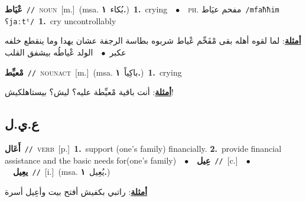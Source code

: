 \documentclass[10pt,a4paper,twoside]{article} %
\begin{document}
\begin{multicols}{2}
{\setlength\topsep{0pt}\textbf{\foreignlanguage{arabic}{عْيَاط}}\ {\color{gray}\texttt{//}\color{black}}\ \textsc{noun}\ [m.]\ \color{gray}(msa. \foreignlanguage{arabic}{بُكاء}~\foreignlanguage{arabic}{\textbf{١.}})\color{black}\ \textbf{1.}~crying\ \ $\bullet$\ \ \textsc{ph.} \color{gray} \foreignlanguage{arabic}{مفحم عيَاط}\color{black}\ {\color{gray}\texttt{/{\sffamily mfaħħim ʕjaːtˤ}/}\color{black}}\ \textbf{1.}~cry uncontrollably\  \begin{flushright}\color{gray}\foreignlanguage{arabic}{\textbf{\underline{\foreignlanguage{arabic}{أمثلة}}}: لما لقوه أهله بقى مْفَحِّم عْياط شربوه بطاسة الرجفة عشان يهدا وما ينقطع خلفه عكبر\ $\bullet$\ \  الولد عْياطُه بيشفق القلب}\end{flushright}\color{black}} \vspace{2mm}

{\setlength\topsep{0pt}\textbf{\foreignlanguage{arabic}{مْعيِّط}}\ {\color{gray}\texttt{//}\color{black}}\ \textsc{noun\textunderscore act}\ [m.]\ \color{gray}(msa. \foreignlanguage{arabic}{باكِياً}~\foreignlanguage{arabic}{\textbf{١.}})\color{black}\ \textbf{1.}~crying\  \begin{flushright}\color{gray}\foreignlanguage{arabic}{\textbf{\underline{\foreignlanguage{arabic}{أمثلة}}}: أنت باقية مْعيِّطة عليه؟ ليش؟ بيستاهلكيش!}\end{flushright}\color{black}} \vspace{2mm}

\vspace{-3mm}
\subsection*{\color{blue}\foreignlanguage{arabic}{ع.ي.ل}\color{blue}{}} 

{\setlength\topsep{0pt}\textbf{\foreignlanguage{arabic}{أَعَال}}\ {\color{gray}\texttt{//}\color{black}}\ \textsc{verb}\ [p.]\ \textbf{1.}~support (one's family) financially.  \textbf{2.}~provide financial assistance and the basic needs for(one's family)\ \ $\bullet$\ \ \setlength\topsep{0pt}\textbf{\foreignlanguage{arabic}{عِيل}}\ {\color{gray}\texttt{//}\color{black}}\ [c.]\ \ $\bullet$\ \ \setlength\topsep{0pt}\textbf{\foreignlanguage{arabic}{يعِيل}}\ {\color{gray}\texttt{//}\color{black}}\ [i.]\ \color{gray}(msa. \foreignlanguage{arabic}{يُعِيل}~\foreignlanguage{arabic}{\textbf{١.}})\color{black}\  \begin{flushright}\color{gray}\foreignlanguage{arabic}{\textbf{\underline{\foreignlanguage{arabic}{أمثلة}}}: راتبي بكفيش أفتح بيت وأعِيل أسرة}\end{flushright}\color{black}} \vspace{2mm}


\end{multicols}
\end{document}
